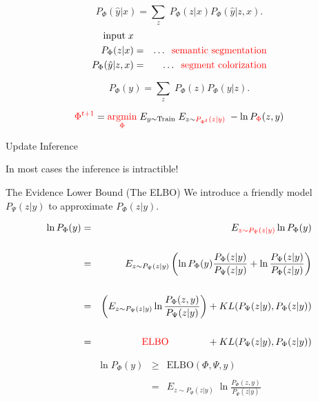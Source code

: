 {\vfill
{\color{red} $$P_\Phi(\hat{y}|x) = \sum_z\;P_\Phi(z|x)P_\Phi(\hat{y}|z,x).$$}
\begin{eqnarray*}
\mbox{input}\; x \\
P_\Phi(z|x) & = & \ldots \;\;\mbox{\color{red} semantic segmentation} \\
P_\Phi(\hat{y}|z,x) & = & \ldots \;\;\mbox{\color{red} segment colorization} \\
\end{eqnarray*}


{\color{red} $$P_\Phi(y) = \sum_z\;P_\Phi(z)P_\Phi(y|z).$$}

$${\color{red} \Phi^{t+1}} =  {\color{red} \operatorname*{argmin}_\Phi}\;E_{y \sim \mathrm{Train}} \;E_{z \sim {\color{red} P_{\Phi^t}(z|y)}}\; - \ln P_{\color{red} \Phi}(z,y)$$
\centerline{\hspace{1em} Update \hspace{6em} Inference \hspace{2.5em}~}

\vfill
{\color{red} In most cases the inference is intractible!}

{The Evidence Lower Bound (The ELBO)}
We introduce a friendly model {\color{red} $P_\Psi(z|y)$} to approximate {\color{red} $P_\Phi(z|y)$}.

{\huge
\begin{eqnarray*}
        \ln P_\Phi(y) & = & E_{\color{red} z \sim P_\Psi(z|y)} \ln P_\Phi(y) \\
\\
 & = & E_{z \sim P_\Psi(z|y)} \left(\ln P_\Phi(y)\frac{P_\Phi(z|y)}{P_\Psi(z|y)} + \ln \frac{P_\Psi(z|y)}{P_\Phi(z|y)}\right) \\
 \\
  & = & \left(E_{z \sim P_\Psi(z|y)} \ln \frac{P_\Phi(z,y)}{P_\Psi(z|y)}\right) + KL(P_\Psi(z|y),P_\Phi(z|y)) \\
  \\
  & = & \hspace{4em} \mathrm{\color{red} ELBO} \hspace{4em}  + KL(P_\Psi(z|y),P_\Phi(z|y))
\end{eqnarray*}
}


\begin{eqnarray*}
\ln P_\Phi(y) & \geq & \mathrm{ELBO}(\Phi,\Psi,y) \\
\\
& = & E_{z \sim P_\Psi(z|y)}\;\ln\frac{P_\Phi(z,y)}{P_\Psi(z|y)}
\end{eqnarray*}

}
